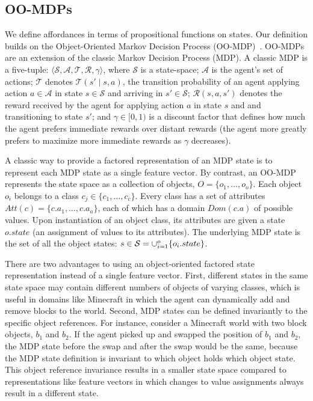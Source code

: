 \documentclass[conference]{IEEEtran}
\begin{document}
\subsection{OO-MDPs}
We define affordances in terms of propositional functions on states. Our definition builds on the Object-Oriented Markov Decision Process
(OO-MDP)~\citep{diuk08}.  OO-MDPs are an extension of
the classic Markov Decision Process (MDP).  A classic MDP is a
five-tuple: $\langle \mathcal{S}, \mathcal{A}, \mathcal{T},
\mathcal{R}, \gamma \rangle$, where $\mathcal{S}$ is a state-space;
$\mathcal{A}$ is the agent's set of actions; $\mathcal{T}$ denotes
$\mathcal{T}(s' \mid s,a)$, the transition probability of an agent
applying action $a \in \mathcal{A}$ in state $s \in \mathcal{S}$ and
arriving in $s' \in \mathcal{S}$; $\mathcal{R}(s,a,s')$ denotes the
reward received by the agent for applying action $a$ in state $s$ and
and transitioning to state $s'$; and $\gamma \in [0, 1)$ is a discount
  factor that defines how much the agent prefers immediate rewards
  over distant rewards (the agent more greatly prefers to maximize
  more immediate rewards as $\gamma$ decreases).

A classic way to provide a factored representation of an MDP state is to represent
each MDP state as a single feature vector. By contrast, an OO-MDP represents the state space as a collection of objects,
$O = \{o_1, \ldots, o_o \}$.  Each object $o_i$ belongs to a
class $c_j \in  \{c_1, \ldots, c_c\}$. Every class has a set of attributes
$Att(c) = \{c.a_1, \ldots, c.a_a \}$, each of which has a domain $Dom(c.a)$ of possible values.
Upon instantiation of an object class, its attributes are given a state $o.state$
(an assignment of values to its attributes).  The underlying MDP state is the set
of all the object states: $s \in {\cal S} = \cup_{i = 1}^o \{o_i.state\}$.

There are two advantages to using an object-oriented factored state
representation instead of a single feature vector. First, different
states in the same state space may contain different numbers of
objects of varying classes, which is useful in domains like Minecraft
in which the agent can dynamically add and remove blocks to the
world. Second, MDP states can be defined invariantly to the specific
object references.  For instance, consider a Minecraft world with two
block objects, $b_1$ and $b_2$.  If the agent picked up and swapped
the position of $b_1$ and $b_2$, the MDP state before the swap and
after the swap would be the same, because the MDP state definition is
invariant to which object holds which object state. This
object reference invariance results in a smaller state space compared
to representations like feature vectors in which changes to value
assignments always result in a different state.
\end{document}
